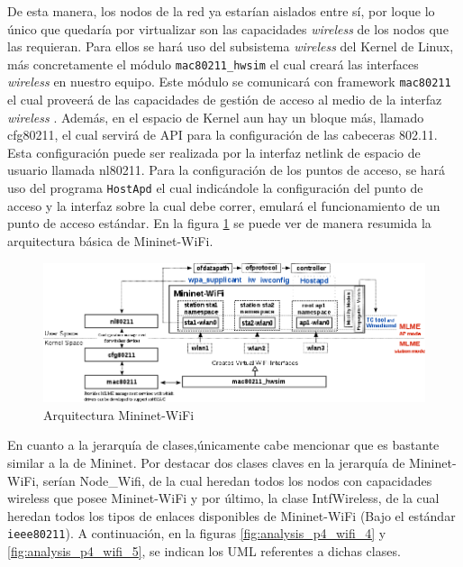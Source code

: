 De esta manera, los nodos de la red ya estarían aislados entre sí, por loque lo único que quedaría por virtualizar son las capacidades \textit{wireless} de los nodos que las requieran. Para ellos se hará uso del subsistema \textit{wireless}  del Kernel de Linux, más concretamente el módulo \texttt{mac80211\_hwsim} el cual creará las interfaces \textit{wireless}  en nuestro equipo. Este módulo se comunicará con framework \texttt{mac80211} el cual proveerá de las capacidades de gestión de acceso al medio de la interfaz \textit{wireless} . Además, en el espacio de Kernel aun hay un bloque más, llamado cfg80211, el cual servirá de API para la configuración de las cabeceras 802.11. Esta configuración puede ser realizada por la interfaz netlink de espacio de usuario llamada nl80211. Para la configuración de los puntos de acceso, se hará uso del programa \texttt{HostApd} el cual indicándole la configuración del punto de acceso y la interfaz sobre la cual debe correr, emulará el funcionamiento de un punto de acceso estándar. En la  figura \ref{fig:analysis_p4_wifi_3} se puede ver de manera resumida la arquitectura básica de Mininet-WiFi.\\
\par

\begin{figure}[ht]
    \centering
    \includegraphics[width=15cm]{archivos/img/dev/p4-wifi/analysis/mininet_wifi_components.png}
    \caption{Arquitectura Mininet-WiFi \cite{7367387}}
    \label{fig:analysis_p4_wifi_3}
\end{figure}


En cuanto a la jerarquía de clases,únicamente cabe mencionar que es bastante similar a la de Mininet. Por destacar dos clases claves en la jerarquía de Mininet-WiFi, serían Node\_Wifi, de la cual heredan todos los nodos con capacidades wireless que posee Mininet-WiFi y por último, la clase IntfWireless, de la cual heredan todos los tipos de enlaces disponibles de Mininet-WiFi (Bajo el estándar \texttt{ieee80211}). A continuación,  en la figuras \ref{fig:analysis_p4_wifi_4} y \ref{fig:analysis_p4_wifi_5}, se indican los UML referentes a dichas clases.\\
\par


